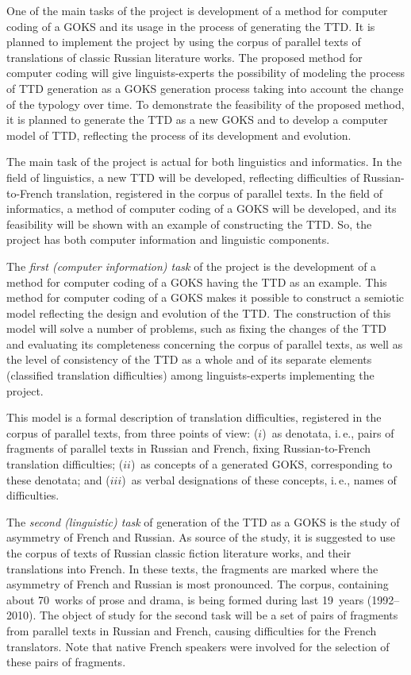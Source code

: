 \begin{multicols}{2}
   One of the main tasks of the project is development of a method for computer coding of a GOKS 
and its usage in the process of generating the TTD. 
It is planned to implement the project by using the corpus of parallel texts of 
translations of classic Russian literature works. The proposed method for computer coding will 
give linguists-experts the possibility of modeling the process of TTD generation as a GOKS 
generation process taking into account the change of the typology over time. To demonstrate the 
feasibility of the proposed method, it is planned to generate the TTD as a new GOKS and to 
develop a computer model of TTD, reflecting the process of its development and evolution.
   
   The main task of the project is actual for both linguistics and informatics. In the field of 
linguistics, a new TTD will be developed, reflecting difficulties of Russian-to-French translation, 
registered in the corpus of parallel texts. In the field of informatics, a method of computer 
coding of a GOKS will be developed, and its feasibility will be shown with an example of 
constructing the TTD. So, the project has both computer information and linguistic components.
   
   The \textit{first (computer information) task} of the project is the development of a method 
for computer coding of a GOKS having the TTD as an example. This method for computer 
coding of a GOKS makes it possible to construct a semiotic model reflecting the design and 
evolution of the TTD. The construction of this model will solve a number of problems, such as 
fixing the changes of the TTD and evaluating its completeness concerning the corpus of parallel 
texts, as well as the level of consistency of the TTD as a whole and of its separate elements 
(classified translation difficulties) among linguists-experts implementing the project.
   
   This model is a formal description of translation difficulties, registered in the corpus of 
parallel texts, from three points of view: ($i$)~as denotata, i.\,e., pairs of fragments of parallel texts 
in Russian and French, fixing Russian-to-French translation difficulties; ($ii$)~as \mbox{concepts} of a 
generated GOKS, corresponding to these denotata; and ($iii$)~as verbal designations of these \mbox{concepts}, 
i.\,e., names of difficulties.
   
   The \textit{second (linguistic) task} of generation of the TTD as a GOKS is the study of 
asymmetry of French and Russian. As source of the study, it is suggested to use the corpus of 
texts of Russian classic fiction literature works, and their translations into French. In these texts, the 
fragments are marked where the asymmetry of French and Russian is most pronounced. The 
corpus, containing about 70~works of prose and drama, is being formed during last 19~years 
(1992--2010). The object of study for the second task will be a set of pairs of fragments from 
parallel texts in Russian and French, causing difficulties for the French translators. Note that 
native French speakers were involved for the selection of these pairs of fragments.
   

\end{multicols}
